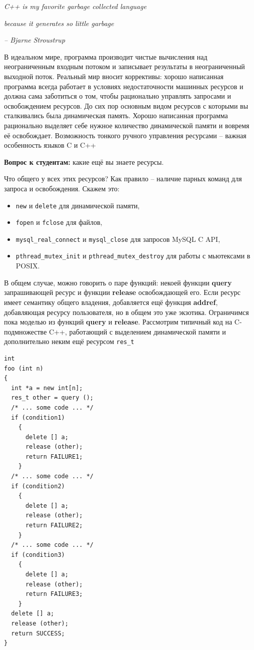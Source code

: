 \documentclass[a4paper,12pt,oneside]{article}
\newif\ifanswers
\begin{document}
\hfill\textit{C++ is my favorite garbage collected language}

\hfill\textit{because it generates so little garbage}{\vspace{0.5em}}

\hfill\textit{-- Bjarne Stroustrup}

В идеальном мире, программа производит чистые вычисления над неограниченным входным потоком и записывает результаты в неограниченный выходной поток. Реальный мир вносит коррективы: хорошо написанная программа всегда работает в условиях недостаточности машинных ресурсов и должна сама заботиться о том, чтобы рационально управлять запросами и освобождением ресурсов. До сих пор основным видом ресурсов с которыми вы сталкивались была динамическая память. Хорошо написанная программа рационально выделяет себе нужное количество динамической памяти и вовремя её освобождает. Возможность тонкого ручного управления ресурсами -- важная особенность языков C и C++

\textbf{Вопрос к студентам:} какие ещё вы знаете ресурсы.

\ifanswers
Ожидаемые ответы: файловые дескрипторы, мьютексы, шрифты и кисти, объекты гуя, соединения с бд, сокеты.
\fi

Что общего у всех этих ресурсов? Как правило -- наличие парных команд для запроса и освобождения. 
Скажем это: 
\begin{itemize}
\item
\lstinline!new! и \lstinline!delete! для динамической памяти, 
\item
\lstinline!fopen! и \lstinline!fclose! для файлов, 
\item
\lstinline!mysql_real_connect! и \lstinline!mysql_close! для запросов MySQL C API, 
\item
\lstinline!pthread_mutex_init! и \lstinline!pthread_mutex_destroy! для работы с мьютексами в POSIX. 
\end{itemize}

В общем случае, можно говорить о паре функций: некоей функции \textbf{query} запрашивающей ресурс и функции \textbf{release} освобождающей его. Если ресурс имеет семантику общего владения, добавляется ещё функция \textbf{addref}, добавляющая ресурсу пользователя, но в общем это уже экзотика. Ограничимся пока моделью из функций \textbf{query} и \textbf{release}. Рассмотрим типичный код на C-подмножестве C++, работающий с выделением динамической памяти и дополнительно неким ещё ресурсом \lstinline!res_t!

\begin{lstlisting}
int
foo (int n)
{
  int *a = new int[n];
  res_t other = query ();
  /* ... some code ... */
  if (condition1)
    {
      delete [] a;
      release (other);
      return FAILURE1;      
    }
  /* ... some code ... */
  if (condition2)
    {
      delete [] a;
      release (other);
      return FAILURE2; 
    }
  /* ... some code ... */
  if (condition3)
    {
      delete [] a;
      release (other);
      return FAILURE3;
    }
  delete [] a;
  release (other);
  return SUCCESS;
}

\end{lstlisting}
\end{document}
